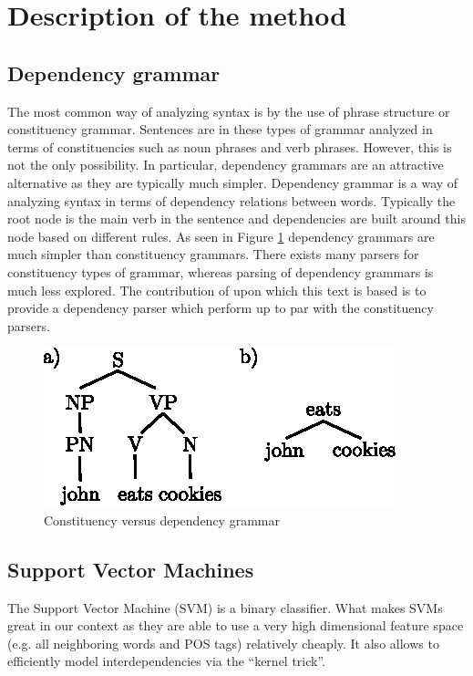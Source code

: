 \documentclass[12pt]{amsart}
\begin{document}
\section{Description of the method}

\subsection{Dependency grammar}
The most common way of analyzing syntax is by the use of phrase structure or constituency grammar. Sentences are in these types of grammar analyzed in terms of constituencies such as noun phrases and verb phrases. However, this is not the only possibility. In particular, dependency grammars are an attractive alternative as they are typically much simpler. Dependency grammar is a way of analyzing syntax in terms of dependency relations between words. Typically the root node is the main verb in the sentence and dependencies are built around this node based on different rules. As seen in Figure \ref{dep} dependency grammars are much simpler than constituency grammars. There exists many parsers for constituency types of grammar, whereas parsing of dependency grammars is much less explored. The contribution of \cite{yamada2003statistical} upon which this text is based is to provide a dependency parser which perform up to par with the constituency parsers.
\begin{figure}
\center
\label{dep}
\caption{Constituency versus dependency grammar}
\includegraphics[scale=1.5]{dep.eps}
\end{figure}

\subsection{Support Vector Machines}

The Support Vector Machine (SVM) is a binary classifier. What makes SVMs great in our context as they are able to use a very high dimensional feature space (e.g. all neighboring words and POS tags) relatively cheaply. It also allows to efficiently model interdependencies via the ``kernel trick''.
\end{document}
